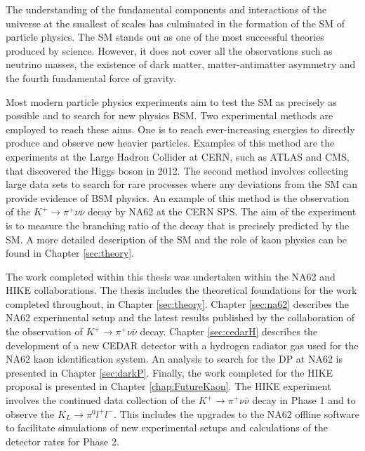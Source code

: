 \documentclass[../../main.tex]{subfiles}
\begin{document}
    The understanding of the fundamental components and interactions of the universe at the smallest of scales has culminated in the formation of the \gls{SM} of particle physics. The \gls{SM} stands out as one of the most successful theories produced by science. However, it does not cover all the observations such as neutrino masses, the existence of dark matter, matter-antimatter asymmetry and the fourth fundamental force of gravity.
    
    Most modern particle physics experiments aim to test the \gls{SM} as precisely as possible and to search for new physics \gls{BSM}. Two experimental methods are employed to reach these aims. One is to reach ever-increasing energies to directly produce and observe new heavier particles. Examples of this method are the experiments at the Large Hadron Collider at CERN, such as ATLAS and CMS, that discovered 
    the Higgs boson in 2012. The second method involves collecting large data sets to search for rare processes where any deviations from the \gls{SM} can provide evidence of \gls{BSM} physics. An example of this method is the observation of the $K^+ \to \pi^+ \nu \bar\nu$ decay by NA62 at the CERN \gls{SPS}. The aim of the experiment is to measure the branching ratio of the decay that is precisely predicted by the \gls{SM}. 
    A more detailed description of the \gls{SM} and the role of kaon physics can be found in Chapter \ref{sec:theory}. 

    The work completed within this thesis was undertaken within the NA62 and HIKE collaborations. The thesis includes the theoretical foundations for the work completed throughout, in Chapter \ref{sec:theory}. Chapter \ref{sec:na62} describes the NA62 experimental setup and the latest results published by the collaboration of the observation of $K^+ \to \pi^+ \nu \bar\nu$ decay.
    Chapter \ref{sec:cedarH} describes the development of a new CEDAR detector with a hydrogen radiator gas used for the NA62 kaon identification system. An analysis to search for the \gls{DP} at NA62 is presented in Chapter \ref{sec:darkP}. Finally, the work completed for the \gls{HIKE} proposal is presented in Chapter \ref{chap:FutureKaon}. The \gls{HIKE} experiment involves the continued data collection of the $K^+ \to \pi^+ \nu \bar\nu$ decay in Phase 1 and to observe the $K_L \to \pi^0l^+l^-$. This includes the upgrades to the NA62 offline software to facilitate simulations of new experimental setups and calculations of the detector rates for Phase 2.

    \ifSubfilesClassLoaded{%
        
    }{} 
\end{document}
